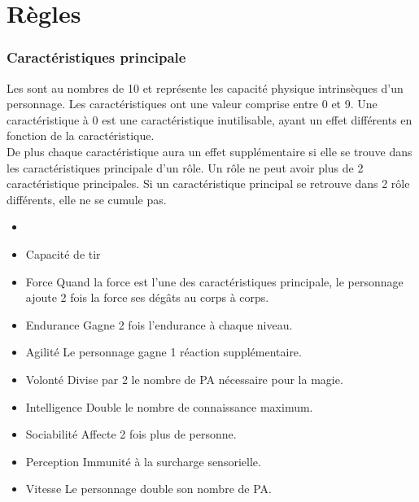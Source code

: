\part{Règles}

\section{Caractéristiques principale}

Les  sont au nombres de 10 et représente les capacité physique intrinsèques d'un personnage. Les caractéristiques ont une valeur comprise entre 0 et 9. Une caractéristique à 0 est une caractéristique inutilisable, ayant un effet différents en fonction de la caractéristique. \\
De plus chaque caractéristique aura un effet supplémentaire si elle se trouve dans les caractéristiques principale d'un rôle. Un rôle ne peut avoir plus de 2 caractéristique principales. Si un caractéristique principal se retrouve dans 2 rôle différents, elle ne se cumule pas.

\begin{itemize}
\item {}
\item Capacité de tir
\item Force Quand la force est l'une des caractéristiques principale, le personnage ajoute 2 fois la force ses dégâts au corps à corps.
\item Endurance Gagne 2 fois l'endurance à chaque niveau.
\item Agilité Le personnage gagne 1 réaction supplémentaire.
\item Volonté Divise par 2 le nombre de PA nécessaire pour la magie.
\item Intelligence Double le nombre de connaissance maximum.
\item Sociabilité Affecte 2 fois plus de personne.
\item Perception Immunité à la surcharge sensorielle. 
\item Vitesse Le personnage double son nombre de PA.
\end{itemize} 

